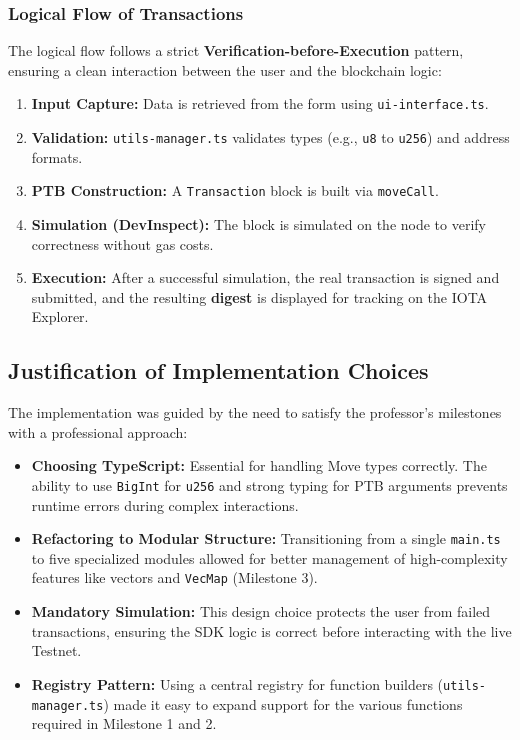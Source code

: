 \documentclass[12pt,a4paper]{article}
\begin{document}
\subsubsection{Logical Flow of Transactions}

The logical flow follows a strict \textbf{Verification-before-Execution} pattern, ensuring a clean interaction between the user and the blockchain logic:
\begin{enumerate}
    \item \textbf{Input Capture:} Data is retrieved from the form using \texttt{ui-interface.ts}.
    \item \textbf{Validation:} \texttt{utils-manager.ts} validates types (e.g., \texttt{u8} to \texttt{u256}) and address formats.
    \item \textbf{PTB Construction:} A \texttt{Transaction} block is built via \texttt{moveCall}.
    \item \textbf{Simulation (DevInspect):} The block is simulated on the node to verify correctness without gas costs.
    \item \textbf{Execution:} After a successful simulation, the real transaction is signed and submitted, and the resulting \textbf{digest} is displayed for tracking on the IOTA Explorer.
\end{enumerate}

\subsection{Justification of Implementation Choices}

The implementation was guided by the need to satisfy the professor's milestones with a professional approach:

\begin{itemize}
    \item \textbf{Choosing TypeScript:} Essential for handling Move types correctly. The ability to use \texttt{BigInt} for \texttt{u256} and strong typing for PTB arguments prevents runtime errors during complex interactions.
    \item \textbf{Refactoring to Modular Structure:} Transitioning from a single \texttt{main.ts} to five specialized modules allowed for better management of high-complexity features like vectors and \texttt{VecMap} (Milestone 3).
    \item \textbf{Mandatory Simulation:} This design choice protects the user from failed transactions, ensuring the SDK logic is correct before interacting with the live Testnet.
    \item \textbf{Registry Pattern:} Using a central registry for function builders (\texttt{utils-manager.ts}) made it easy to expand support for the various functions required in Milestone 1 and 2.
\end{itemize}
\end{document}
